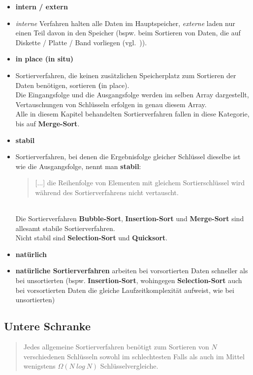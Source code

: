 \begin{itemize}
    \item \textbf{intern / extern}
    \item[] \textit{interne} Verfahren halten alle Daten im Hauptspeicher, \textit{externe} laden nur einen Teil davon in den Speicher (bspw. beim Sortieren von Daten, die auf Diskette / Platte / Band vorliegen (vgl.~\cite[80]{OW17b})).
    \item \textbf{in place (in situ)}
    \item [] Sortierverfahren, die keinen zusätzlichen Speicherplatz zum Sortieren der Daten benötigen, sortieren \textbf(in place).\\
    Die Eingangsfolge und die Ausgangsfolge werden im selben Array dargestellt, Vertauschungen von Schlüsseln erfolgen in genau diesem Array.\\
    Alle in diesem Kapitel behandelten Sortierverfahren fallen in diese Kategorie, bis auf \textbf{Merge-Sort}.
    \item \textbf{stabil}
    \item[] Sortierverfahren, bei denen die Ergebnisfolge gleicher Schlüssel dieselbe ist wie die Ausgangsfolge, nennt man \textbf{stabil}:\blockquote[{\cite[164]{OW17b}}]{
        [...] die Reihenfolge von Elementen mit gleichem Sortierschlüssel wird während des Sortierverfahrens nicht vertauscht.
    }.\\
    Die Sortierverfahren \textbf{Bubble-Sort}, \textbf{Insertion-Sort} und \textbf{Merge-Sort} sind allesamt stabile Sortierverfahren.\\
    Nicht stabil sind \textbf{Selection-Sort} und \textbf{Quicksort}.
    \item \textbf{natürlich}
    \item[] \textbf{natürliche Sortierverfahren} arbeiten bei vorsortierten Daten schneller als bei unsortierten (bspw. \textbf{Insertion-Sort}, wohingegen \textbf{Selection-Sort} auch bei vorsortierten Daten die gleiche Laufzeitkomplexität aufweist, wie bei unsortierten)
\end{itemize}


\subsection{Untere Schranke}

\blockquote[{\cite[154, Satz2.4]{OW17b}}]{
    Jedes allgemeine Sortierverfahren benötigt zum Sortieren von $N$ verschiedenen Schlüsseln sowohl im schlechtesten Falls als auch im Mittel wenigstens $\Omega(N\ log\ N)$ Schlüsselvergleiche.
}.


